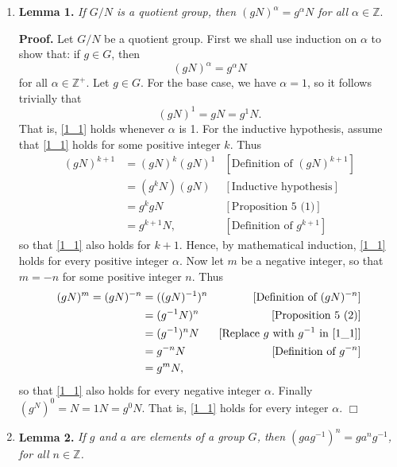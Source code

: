\documentclass[9pt]{article}
\newcommand{\qed}{\hfill \ensuremath{\Box}}
\newcommand{\Z}{\mathbb{Z}}
\begin{document}
\begin{enumerate}
   \item[]        \textbf{Lemma 1.} \textit{If $G/N$ is a quotient group, then
                  $(gN)^\alpha = g^\alpha N$ for all $\alpha \in \Z$}.
                  
      \textbf{Proof.} Let $G/N$ be a quotient group. First we shall use
      induction on $\alpha$ to show that: if $g \in G$, then
      \begin{equation} \label{1_1}
         (gN)^\alpha = g^\alpha N
      \end{equation}
      for all $\alpha \in \Z^+$. Let $g \in G$. For the base case, we have
      $\alpha = 1$, so it follows trivially that
      $$(gN)^1 = gN = g^1N.$$
      That is, \eqref{1_1} holds whenever $\alpha$ is 1. For the inductive
      hypothesis, assume that \eqref{1_1} holds for some positive integer $k$.
      Thus
      \begin{align*}
         (gN)^{k+1} &= (gN)^k(gN)^1 &[\text{Definition of }(gN)^{k+1}] \\
            &= (g^kN)(gN) &[\text{Inductive hypothesis}] \\
            &= g^kgN &[\text{Proposition 5 (1)}] \\
            &= g^{k+1}N, &[\text{Definition of }g^{k+1}]
      \end{align*}
      so that \eqref{1_1} also holds for $k + 1$. Hence, by mathematical
      induction, \eqref{1_1} holds for every positive integer $\alpha$. Now let
      $m$ be a negative integer, so that $m = -n$ for some positive integer $n$.
      Thus
      \begin{align*}
         (gN)^m = (gN)^{-n} &= ((gN)^{-1})^n &[\text{Definition of }(gN)^{-n}]\\
            &= (g^{-1}N)^n &[\text{Proposition 5 (2)}] \\
            &= (g^{-1})^nN &[\text{Replace $g$ with $g^{-1}$ in }\eqref{1_1}] \\
            &= g^{-n}N &[\text{Definition of }g^{-n}] \\
            &= g^mN,
      \end{align*}
      so that \eqref{1_1} also holds for every negative integer $\alpha$.
      Finally $(g^N)^0 = N = 1N = g^0N$. That is, \eqref{1_1} holds for every
      integer $\alpha$. \qed
   \item[]        \textbf{Lemma 2.} \textit{If $g$ and $a$ are elements of a
                  group $G$, then $(gag^{-1})^n = ga^ng^{-1}$, for all
                  $n \in \Z$.}
                  

\end{enumerate}
\end{document}
